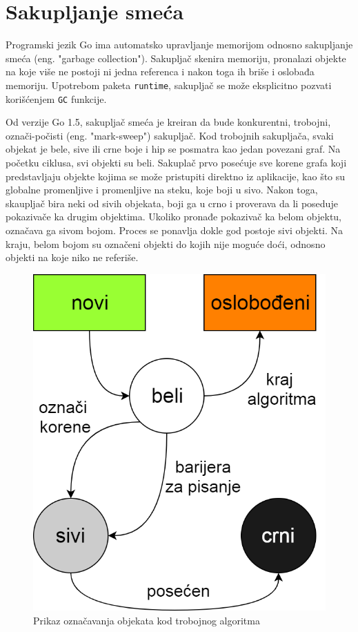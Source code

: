 \documentclass[12pt,oneside]{memoir}
\begin{document}
\section{Sakupljanje smeća}

Programski jezik Go ima automatsko upravljanje memorijom odnosno sakupljanje smeća (eng. "garbage collection"). Sakupljač skenira memoriju, pronalazi objekte na koje više ne postoji ni jedna referenca i nakon toga ih briše i oslobađa memoriju. Upotrebom paketa \texttt{runtime}, sakupljač se može eksplicitno pozvati korišćenjem \texttt{GC} funkcije. 

Od verzije Go 1.5, sakupljač smeća \cite{garbage} je kreiran da bude konkurentni, trobojni, označi-počisti (eng. "mark-sweep") sakupljač. Kod trobojnih sakupljača, svaki objekat je bele, sive ili crne boje i hip se posmatra kao jedan povezani graf. Na početku ciklusa, svi objekti su beli. Sakuplač prvo posećuje sve korene grafa koji predstavljaju objekte kojima se može pristupiti direktno iz aplikacije, kao što su globalne promenljive i promenljive na steku, koje boji u sivo. Nakon toga, skaupljač bira neki od sivih objekata, boji ga u crno i proverava da li poseduje pokazivače ka drugim objektima. Ukoliko pronađe pokazivač ka belom objektu, označava ga sivom bojom. Proces se ponavlja dokle god postoje sivi objekti. Na kraju, belom bojom su označeni objekti do kojih nije moguće doći, odnosno objekti na koje niko ne referiše.

\begin{figure}
\begin{center}
\includegraphics[scale=0.33]{tricolor.png}
\end{center}
\caption{Prikaz označavanja objekata kod trobojnog algoritma}
\label{fig:tricolor}
\end{figure}
\end{document}
